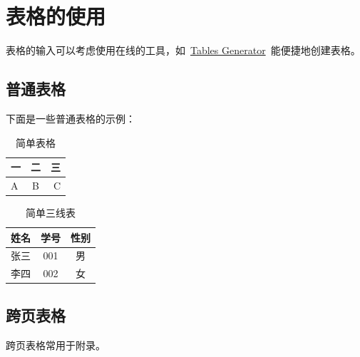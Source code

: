 \section{表格的使用}

表格的输入可以考虑使用在线的工具，如~\href{https://www.tablesgenerator.com/}{Tables Generator}~能便捷地创建表格。

\subsection{普通表格}
下面是一些普通表格的示例：

\begin{table}[ht]
  \centering
  \caption{简单表格}
  \label{tab:1}
  \begin{tabular}{|l|c|r|}
    \hline
    一& 二 & 三\\
    \hline
    A& B& C\\
    \hline
  \end{tabular}
\end{table}

\begin{table}[ht]
  \centering
  \caption{简单三线表}
  \label{tab:2}
  \begin{tabular}{ccc}
    \hline
    姓名& 学号& 性别\\
    \hline
    张三& 001& 男\\
    李四& 002& 女\\
    \hline
  \end{tabular}
\end{table}

\subsection{跨页表格}

跨页表格常用于附录。

